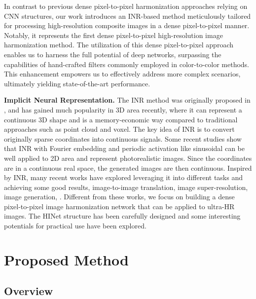 \documentclass[10pt,journal,twocolumn,twoside]{IEEEtran}
\begin{document}
In contrast to previous dense pixel-to-pixel harmonization approaches relying on CNN structures, our work introduces an INR-based method meticulously tailored for processing high-resolution composite images in a dense pixel-to-pixel manner. Notably, it represents the first dense pixel-to-pixel high-resolution image harmonization method. The utilization of this dense pixel-to-pixel approach enables us to harness the full potential of deep networks, surpassing the capabilities of hand-crafted filters commonly employed in color-to-color methods. This enhancement empowers us to effectively address more complex scenarios, ultimately yielding state-of-the-art performance.


\textbf{Implicit Neural Representation.} The INR method was originally proposed in \cite{stanley2007compositional}, and has gained much popularity in 3D area recently\cite{mildenhall2021nerf, park2019deepsdf, mescheder2019occupancy}, where it can represent a continuous 3D shape and is a memory-economic way compared to traditional approaches\cite{choy20163d, fan2017point, wang2018pixel2mesh, wang2021lossy, benedek2016lidar} such as point cloud and voxel. The key idea of INR is to convert originally sparse coordinates into continuous signals. Some recent studies  \cite{tancik2020fourier,sitzmann2020implicit} show that INR with Fourier embedding and periodic activation like sinusoidal can be well applied to 2D area and represent photorealistic images. Since the coordinates are in a continuous real space, the generated images are then continuous. Inspired by INR, many recent works have explored leveraging it into different tasks and achieving some good results, \eg image-to-image translation\cite{shaham2021spatially}, image super-resolution\cite{chen2021learning}, image generation\cite{anokhin2021image, skorokhodov2021adversarial, karras2021alias}, \etc. Different from these works, we focus on building a dense pixel-to-pixel image harmonization network that can be applied to ultra-HR images. The HINet structure has been carefully designed and some interesting potentials for practical use have been explored.


\section{Proposed Method}
\label{sec:method}

\subsection{Overview}
\label{subsec:overview}
\end{document}
